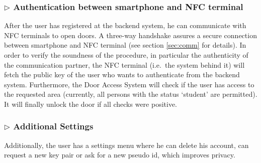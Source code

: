 


\subsubsection*{$\triangleright$ Authentication between smartphone and NFC terminal}

After the user has registered at the backend system, he can communicate with NFC terminals to open doors. 
A three-way handshake assures a secure connection between smartphone and NFC terminal (see section \ref{sec:comm} for details).
In order to verify the soundness of the procedure, in particular the authenticity of the communication partner, the NFC terminal (i.e.~the system behind it) will fetch the public key of the user who wants to authenticate from the backend system.
Furthermore, the Door Access System will check if the user has access to the requested area (currently, all persons with the status `student' are permitted).
It will finally unlock the door if all checks were positive.

\subsubsection*{$\triangleright$ Additional Settings}
Additionally, the user has a settings menu where he can delete his account, can request a new key pair or ask for a new pseudo id, which improves privacy.

